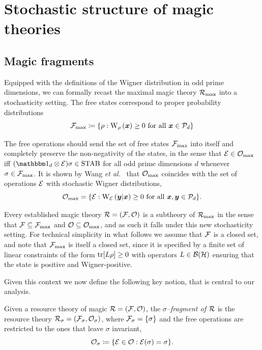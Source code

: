 \documentclass[pra,
aps,
twocolumn,
superscriptaddress,
groupedaddress,
nofootinbib,
reprint
]{revtex4-1}
\begin{document}

\section{Stochastic structure of magic theories}
\label{sec:struc}

\subsection{Magic fragments}\label{sec:magfrag}

Equipped with the definitions of the Wigner distribution in odd prime dimensions, we can formally recast the maximal magic theory $\Rmax$ into a stochasticity setting.
The free states correspond to proper probability distributions 
\begin{equation}
    \Fmax \coloneqq \{ \rho: \W[\bmx]{\rho} \geq 0 \text{ for all } \bmx \in \cal{P}_d\}
\end{equation}

The free operations should send the set of free states $\Fmax$ into itself and completely preserve the non-negativity of the states, in the sense that $\E \in \Omax$ iff $(\id_d \otimes \E ) \sigma \in \stab$ for all odd prime dimensions $d$ whenever $\sigma \in \Fmax$.
It is shown by Wang \textit{et al.}~\cite{cit:wang} that $\Omax$ coincides with the set of operations $\E$ with stochastic Wigner distributions, 
\begin{equation}
    \Omax = \{ \E: \W[\bmy|\bmx]{\E} \geq 0 \text{ for all } \bmx, \bmy \in \cal{P}_d\}.
\end{equation}

Every established magic theory $\R = (\F, \O)$ is a subtheory of $\Rmax$ in the sense that $\F \subseteq \Fmax$ and $\O \subseteq \Omax$, and as such it falls under this new stochasticity setting. 
For technical simplicity in what follows we assume that $\F$ is a closed set, and note that $\F_{\rm{ max}}$ is itself a closed set, since it is specified by a finite set of linear constraints of the form $\tr[ L\rho] \geq 0$ with operators $L \in \cal{B}(\cal{H})$ ensuring that the state is positive and Wigner-positive.


Given this context we now define the following key notion, that is central to our analysis.
\begin{definition}\label{def:sigmafrag}
   Given a resource theory of magic $\R = (\F, \O)$, the \emph{$\sigma$--fragment of $\R$} is the resource theory $\R_\sigma = (\F_\sigma, \O_\sigma)$, where $\F_\sigma = \{\sigma\}$ and the free operations are restricted to the ones that leave $\sigma$ invariant,
    \begin{equation}
        \O_\sigma \coloneqq \{ \E \in \O: \E(\sigma) = \sigma \}.
    \end{equation}
\end{definition}
\end{document}
